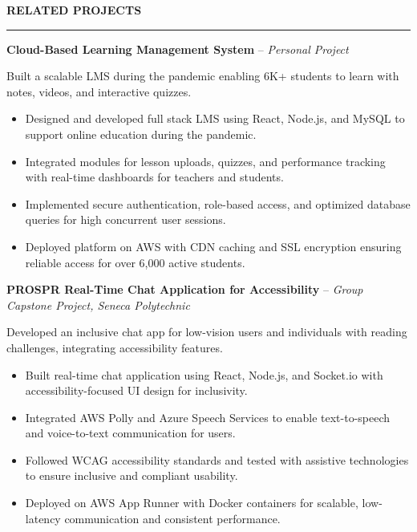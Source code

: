 \documentclass[10pt,letterpaper]{article}
\begin{document}
\vspace{6pt}

\textbf{RELATED PROJECTS}\\[-8pt]
\noindent\rule{\textwidth}{1pt}

\vspace{-2pt}

\textbf{Cloud-Based Learning Management System} -- \emph{Personal Project}

\vspace{-1pt}

Built a scalable LMS during the pandemic enabling 6K+ students to learn with notes, videos, and interactive quizzes.
\vspace{-1pt}
\begin{itemize}
\item Designed and developed full stack LMS using React, Node.js, and MySQL to support online education during the pandemic.
\item Integrated modules for lesson uploads, quizzes, and performance tracking with real-time dashboards for teachers and students.
\item Implemented secure authentication, role-based access, and optimized database queries for high concurrent user sessions.
\item Deployed platform on AWS with CDN caching and SSL encryption ensuring reliable access for over 6,000 active students.
\end{itemize}

\textbf{PROSPR  Real-Time Chat Application for Accessibility} -- \emph{Group Capstone Project, Seneca Polytechnic}

\vspace{-1pt}

Developed an inclusive chat app for low-vision users and individuals with reading challenges, integrating accessibility features.
\vspace{-1pt}
\begin{itemize}
\item Built real-time chat application using React, Node.js, and Socket.io with accessibility-focused UI design for inclusivity.
\item Integrated AWS Polly and Azure Speech Services to enable text-to-speech and voice-to-text communication for users.
\item Followed WCAG accessibility standards and tested with assistive technologies to ensure inclusive and compliant usability.
\item Deployed on AWS App Runner with Docker containers for scalable, low-latency communication and consistent performance.
\end{itemize}
\end{document}
